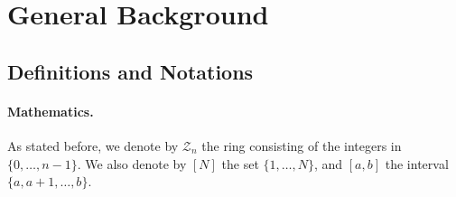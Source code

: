 \documentclass[journal=tosc,submission]{iacrtrans}
\theoremstyle{theorem}
\newcommand\Z{\mathcal{Z}}
\begin{document}





\section{General Background}
\label{sec:notations}

\subsection{Definitions and Notations}

 \paragraph{Mathematics.} As stated before, we denote by $\Z_n$ the ring consisting of the integers in $\{0, \dots, n-1\}$. We also denote by $[N]$ the set $\{1, \dots, N\}$, and $[a,b]$ the interval $\{a, a+1, \dots, b\}$.
\end{document}
